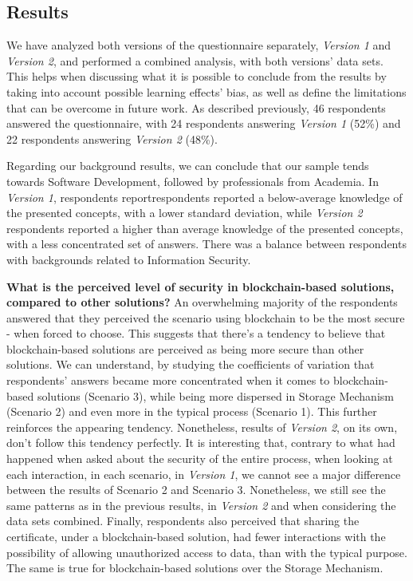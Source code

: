 \subsection{Results}

We have analyzed both versions of the questionnaire separately, \textit{Version 1} and \textit{Version 2}, and performed a combined analysis, with both versions' data sets. This helps when discussing what it is possible to conclude from the results by taking into account possible learning effects' bias, as well as define the limitations that can be overcome in future work. As described previously, 46 respondents answered the questionnaire, with 24 respondents answering \textit{Version 1} (52\%) and 22 respondents answering \textit{Version 2} (48\%).

Regarding our background results, we can conclude that our sample tends towards Software Development, followed by professionals from Academia. In \textit{Version 1}, respondents reportrespondents reported a below-average knowledge of the presented concepts, with a lower standard deviation, while \textit{Version 2} respondents reported a higher than average knowledge of the presented concepts, with a less concentrated set of answers. There was a balance between respondents with backgrounds related to Information Security.

\textbf{What is the perceived level of security in blockchain-based solutions, compared to other solutions?} An overwhelming majority of the respondents answered that they perceived the scenario using blockchain to be the most secure - when forced to choose. This suggests that there's a tendency to believe that blockchain-based solutions are perceived as being more secure than other solutions. We can understand, by studying the coefficients of variation that respondents' answers became more concentrated when it comes to blockchain-based solutions (Scenario 3), while being more dispersed in Storage Mechanism (Scenario 2) and even more in the typical process (Scenario 1). This further reinforces the appearing tendency. Nonetheless, results of \textit{Version 2}, on its own, don't follow this tendency perfectly. It is interesting that, contrary to what had happened when asked about the security of the entire process, when looking at each interaction, in each scenario, in \textit{Version 1}, we cannot see a major difference between the results of Scenario 2 and Scenario 3. Nonetheless, we still see the same patterns as in the previous results, in \textit{Version 2} and when considering the data sets combined. Finally, respondents also perceived that sharing the certificate, under a blockchain-based solution, had fewer interactions with the possibility of allowing unauthorized access to data, than with the typical purpose. The same is true for blockchain-based solutions over the Storage Mechanism.

